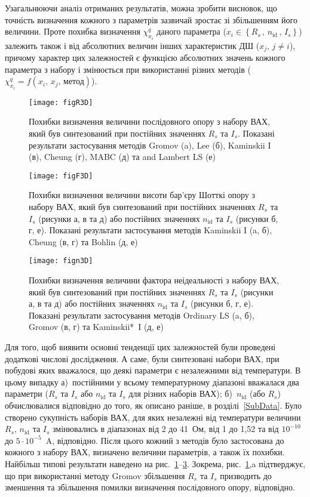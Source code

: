 Узагальнюючи аналіз отриманих результатів, можна зробити висновок, що точність визначення кожного з параметрів зазвичай зростає зі збільшенням його величини.
Проте похибка визначення $\chi^q_{x_i}$ даного параметра ($x_i\in\left\{R_s\,,\,n_\mathrm{id}\,,\, I_s\right\}$) залежить також і від абсолютних величин інших характеристик ДШ ($x_j,\,j\neq i$), причому характер цих залежностей є функцією абсолютних значень кожного параметра з набору і змінюється при використанні різних методів ($\chi^q_{x_i}=f(x_i,\,x_j,\,\text{метод})$).


\begin{figure}
\center
\texttt{[image: figR3D]}%
\caption{\label{figR3D}
Похибки визначення величини послідовного опору з набору ВАХ, який був синтезований при постійних значеннях $R_s$ та $I_s$.
Показані результати застосування методів Gromov (a), Lee (б), Kaminskii I (в), Cheung (г), MABC (д) та and Lambert LS (е)
}
\end{figure}

\begin{figure}
\center
\texttt{[image: figF3D]}%
\caption{\label{figF3D}
Похибки визначення величини висоти бар'єру Шотткі опору з набору ВАХ, який був синтезований при постійних значеннях $R_s$ та $I_s$ (рисунки а, в та д) або постійних значеннях $n_\mathrm{id}$ та $I_s$ (рисунки б, г, е).
Показані результати застосування методів Kaminskii I (a, б), Cheung (в, г) та Bohlin (д, е)
}
\end{figure}


\begin{figure}
\center
\texttt{[image: fign3D]}%
\caption{\label{fign3D}
Похибки визначення величини фактора неідеальності з набору ВАХ, який був синтезований при постійних значеннях $R_s$ та $I_s$ (рисунки а, в та д) або постійних значеннях $n_\mathrm{id}$ та $I_s$ (рисунки б, г, е).
Показані результати застосування методів Ordinary LS (a, б), Gromov (в, г) та Kaminskii*~I (д, е)
}
\end{figure}

Для того, щоб виявити основні тенденції цих залежностей були проведені додаткові числові дослідження.
А саме, були синтезовані набори ВАХ, при побудові яких вважалося, що деякі параметри є незалежними від температури.
В цьому випадку
а)~постійними у всьому температурному діапазоні вважалася два параметри ($R_s$ та $I_s$  або $n_\mathrm{id}$ та $I_s$ для різних наборів ВАХ);
б)~$n_\mathrm{id}$ (або $R_s$) обчислювалися відповідно до того, як описано раніше, в розділі~\ref{SubData}.
Було створено сукупність наборів ВАХ, для яких незалежні від температури величини $R_s$, $n_\mathrm{id}$ та $I_s$ змінювались в діапазонах від
2 до 41~Ом, від 1 до 1,52 та від $10^{-10}$ до $5\cdot10^{-5}$~A, відповідно.
Після цього кожний з методів було застосована до кожного з набору ВАХ, визначено величини параметрів, а також їх похибки.
Найбільш типові результати наведено на рис.~\ref{figR3D}--\ref{fign3D}.
Зокрема, рис.~\ref{figR3D},a підтверджує, що при використанні методу Gromov збільшення $R_s$ та $I_s$ призводить до зменшення та збільшення помилки визначення послідовного опору, відповідно.


